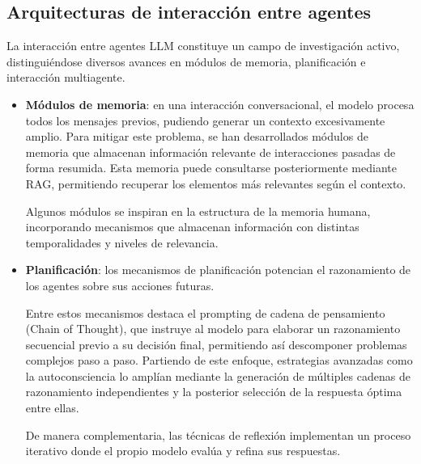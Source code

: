 



\subsection{Arquitecturas de interacción entre agentes}
La interacción entre agentes LLM constituye un campo de investigación activo, distinguiéndose diversos avances en módulos de memoria, planificación e interacción multiagente\cite{wang_survey_2024}.
\begin{itemize}
  \item{\textbf{Módulos de memoria}}: en una interacción conversacional, el modelo procesa todos los mensajes previos, pudiendo generar un contexto excesivamente amplio. Para mitigar este problema, se han desarrollados módulos de memoria que almacenan información relevante de interacciones pasadas de forma resumida\cite{zhang_building_2024-1}\cite{fischer_reflective_2023}\cite{liang_unleashing_2023}. Esta memoria puede consultarse posteriormente mediante RAG, permitiendo recuperar los elementos más relevantes según el contexto\cite{zhao_expel_2024}.

Algunos módulos se inspiran en la estructura de la memoria humana\cite{zhong_memorybank_2024}, incorporando mecanismos que almacenan información con distintas temporalidades y niveles de relevancia\cite{wang_survey_2024}\cite{park_generative_2023}.


\item{\textbf{Planificación}}\label{plani}: los mecanismos de planificación potencian el razonamiento de los agentes sobre sus acciones futuras.

  Entre estos mecanismos destaca el prompting de cadena de pensamiento (Chain of Thought)\cite{wei_chain--thought_2023}, que instruye al modelo para elaborar un razonamiento secuencial previo a su decisión final, permitiendo así descomponer problemas complejos paso a paso.
Partiendo de este enfoque, estrategias avanzadas como la autoconsciencia\cite{liang_unleashing_2023} lo amplían mediante la generación de múltiples cadenas de razonamiento independientes y la posterior selección de la respuesta óptima entre ellas\cite{yao_tree_nodate}\cite{wang_recmind_2024}.

De manera complementaria, las técnicas de reflexión\cite{shinn_reflexion_nodate}\cite{madaan_self-refine_nodate}\cite{miao_selfcheck_2023} implementan un proceso iterativo donde el propio modelo evalúa y refina sus respuestas.


\end{itemize}
